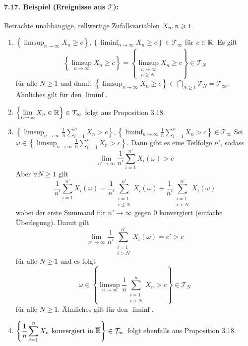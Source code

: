 \documentclass[12pt]{report}
\begin{document}
\paragraph{7.17. Beispiel (Ereignisse aus $\mathcal{T}$):}Betrachte unabh\"angige, rellwertige Zufallsvariablen $X_n,n\geq\nobreak1$.
\begin{enumerate}[label=(\roman*)]
    \item $\left\{\displaystyle\limsup_{n\to\infty}X_n\geq c\right\},\left\{\displaystyle\liminf_{n\to\infty}X_n\geq c\right\}\in\mathcal{T}_\infty$ f\"ur $c\in\R$.\newline
    Es gilt
    $$\left\{\displaystyle\limsup_{n\to\infty}X_n\geq c\right\}=\left\{\limsup_{\substack{n\to\infty\\n\geq N}}X_n\geq c\right\}\in\mathcal{T}_N$$
    f\"ur alle $N\geq1$ und damit $\left\{\displaystyle\limsup_{n\to\infty}X_n\geq c\right\}\in\displaystyle\bigcap_{N\geq1}\mathcal{T}_N=\mathcal{T}_\infty$. \"Ahnliches gilt f\"ur den $\liminf$. 
    \item $\displaystyle\left\{\lim_{n\to\infty}X_n\in\R\right\}\in\mathcal{T}_\infty$ folgt aus Proposition 3.18.
    \item $\left\{\displaystyle\limsup_{n\to\infty}\frac{1}{n}\sum_{i=1}^nX_n > c\right\},\left\{\displaystyle\liminf_{n\to\infty}\frac{1}{n}\sum_{i=1}^nX_n > c\right\}\in\mathcal{T}_\infty$\newline
    Sei $\omega\in\left\{\displaystyle\limsup_{n\to\infty}\frac{1}{n}\sum_{i=1}^nX_n > c\right\}$. Dann gibt es eine Teilfolge $n'$, sodass 
    $$\lim_{n'\to\infty}\frac{1}{n'}\sum_{i=1}^{n'}X_i(\omega)>c$$
    Aber $\forall N\geq1$ gilt
    $$\frac{1}{n'}\sum_{i=1}^{n'}X_i(\omega)=\frac{1}{n'}\sum_{\substack{i=1\\i\leq N}}^{n'}X_i(\omega)+\frac{1}{n'}\sum_{\substack{i=1\\i> N}}^{n'}X_i(\omega)$$
    wobei der erste Summand f\"ur $n'\to\infty$ gegen 0 konvergiert (einfache \"Uberlegung). Damit gilt
    $$\lim_{n'\to\infty}\frac{1}{n'}\sum_{\substack{i=1\\i> N}}^{n'}X_i(\omega)=c'>c$$
    f\"ur alle $N\geq1$ und es folgt
    $$\omega\in \left\{\displaystyle\limsup_{n\to\infty}\frac{1}{n}\sum_{\substack{i=1\\i>N}}^nX_n > c\right\}\in\mathcal{T}_N$$
    f\"ur alle $N\geq1$. \"Ahnliches gilt f\"ur den $\liminf$. 
    \item $\left\{\displaystyle\frac{1}{n}\sum_{i=1}^nX_n \text{ konvergiert in }\overline\R\right\}\in\mathcal{T}_\infty$ folgt ebenfalls aus Proposition 3.18. 
\end{enumerate}
\end{document}
